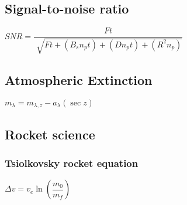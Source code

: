 \subsection{Signal-to-noise ratio}
\begin{itemize}
\itemt \( SNR = \dfrac{Ft}{\sqrt[]{Ft + (B_s n_p t) + (D n_p t) + (R^2 n_p)}} \)
\end{itemize}

\subsection{Atmospheric Extinction}
\begin{itemize}
\itemt \( m_{\lambda} = m_{\lambda,z} - a_\lambda (\sec z) \)
\end{itemize}


\subsection{Rocket science}

\subsubsection{Tsiolkovsky rocket equation}
\begin{itemize}
\itemt \( \Delta v = v_e \ln(\dfrac{m_0}{m_f}) \)
\end{itemize}